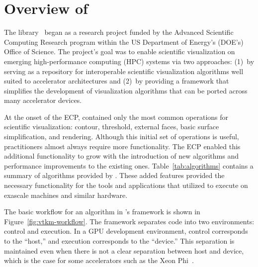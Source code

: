 \section{Overview of \vtkm}
\label{sec:overview}


The \vtkm library~\citep{Moreland2016} began as a research project funded
by the 
Advanced Scientific Computing Research program within the US Department of Energy's (DOE's) Office of Science.
The project's goal was to enable scientific visualization on emerging high-performance computing (HPC) systems via
two approaches:
(1)~by serving as a repository for interoperable scientific visualization algorithms well suited to accelerator architectures and (2)~by providing a framework that simplifies the development of visualization algorithms that can be ported across many accelerator devices.



At the onset of the ECP, \vtkm contained only the most common operations for scientific visualization: contour, threshold, external faces, basic surface simplification, and rendering.
Although this initial set of operations is useful, practitioners almost always require more functionality.
The ECP enabled this additional functionality to grow with the introduction of new algorithms and performance improvements to the existing ones.
Table~\ref{tab:algorithms} contains a summary of algorithms provided by \vtkm.
These added features provided the necessary functionality for the tools and applications that utilized \vtkm to execute on exascale machines and similar hardware.


The basic workflow for an algorithm in \vtkm's framework is shown in Figure~\ref{fig:vtkm-workflow}.
The framework separates code into two environments: control and execution.
In a GPU development environment, control corresponds to the ``host,'' and execution corresponds to the ``device.''
This separation is maintained even when 
there is not a clear separation between host and device, which is the case for some accelerators such as the Xeon Phi~\citep{Jeffers2016}.

